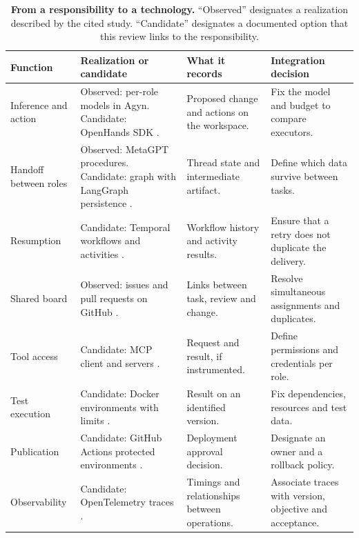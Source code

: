 \documentclass[11pt,a4paper]{article}
\newcommand{\hd}[1]{\textcolor{ink}{\bfseries #1}}
\begin{document}
\begin{table}[!ht]
\caption{\textbf{From a responsibility to a technology.} ``Observed'' designates a realization described by the cited study. ``Candidate'' designates a documented option that this review links to the responsibility.}\label{tab:tech}
\small\renewcommand{\arraystretch}{1.19}\setlength{\tabcolsep}{4pt}
\begin{tabularx}{\linewidth}{@{}L{2.5cm}YYY@{}}
\toprule\hd{Function} & \hd{Realization or candidate} & \hd{What it records} & \hd{Integration decision}\\\midrule
Inference and action & Observed: per-role models in Agyn. Candidate: OpenHands SDK \citep{agyn,openhands}. & Proposed change and actions on the workspace. & Fix the model and budget to compare executors.\\
Handoff between roles & Observed: MetaGPT procedures. Candidate: graph with LangGraph persistence \citep{metagpt,langgraph}. & Thread state and intermediate artifact. & Define which data survive between tasks.\\
Resumption & Candidate: Temporal workflows and activities \citep{temporal}. & Workflow history and activity results. & Ensure that a retry does not duplicate the delivery.\\
Shared board & Observed: issues and pull requests on GitHub \citep{instant,agyn}. & Links between task, review and change. & Resolve simultaneous assignments and duplicates.\\
Tool access & Candidate: MCP client and servers \citep{mcp}. & Request and result, if instrumented. & Define permissions and credentials per role.\\
Test execution & Candidate: Docker environments with limits \citep{docker,swebench}. & Result on an identified version. & Fix dependencies, resources and test data.\\
Publication & Candidate: GitHub Actions protected environments \citep{actions}. & Deployment approval decision. & Designate an owner and a rollback policy.\\
Observability & Candidate: OpenTelemetry traces \citep{otel}. & Timings and relationships between operations. & Associate traces with version, objective and acceptance.\\
\bottomrule\end{tabularx}
\end{table}

\clearpage
\end{document}
